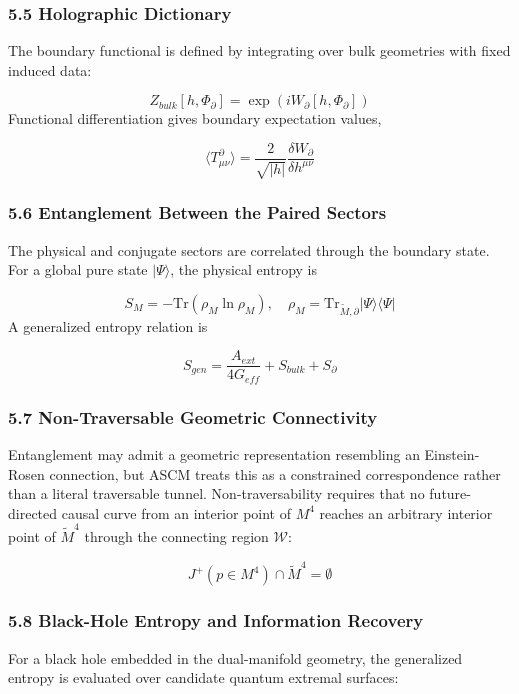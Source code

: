 \documentclass[aps,prd,onecolumn,superscriptaddress,nofootinbib,longbibliography,10pt]{revtex4-2}
\begin{document}
  
\subsubsection*{5.5 Holographic Dictionary}

  The boundary functional is defined by integrating over bulk geometries with fixed induced data:


  \[ Z_{bulk}[h, \Phi_\partial] = \exp(i W_\partial[h, \Phi_\partial]) \]
  Functional differentiation gives boundary expectation values,


  \[ \langle T^\partial_{\mu\nu} \rangle = \frac{2}{\sqrt{|h|}} \frac{\delta W_{\partial}}{\delta h^{\mu\nu}} \]

  
\subsubsection*{5.6 Entanglement Between the Paired Sectors}

  The physical and conjugate sectors are correlated through the boundary state. For a global pure state \(|\Psi\rangle\), the physical entropy is


  \[ S_M = -\text{Tr}(\rho_M \ln\rho_M), \quad \rho_M = \text{Tr}_{\tilde{M},\partial} |\Psi\rangle\langle\Psi| \]
  A generalized entropy relation is


  \[ S_{gen} = \frac{A_{ext}}{4G_{eff}} + S_{bulk} + S_\partial \]

  
\subsubsection*{5.7 Non-Traversable Geometric Connectivity}

  Entanglement may admit a geometric representation resembling an Einstein-Rosen connection, but ASCM treats this as a constrained correspondence rather than a literal traversable tunnel. Non-traversability requires that no future-directed causal curve from an interior point of \(M^4\) reaches an arbitrary interior point of \(\tilde{M}^4\) through the connecting region \(\mathcal{W}\):


  \[ J^+(p \in M^4) \cap \tilde{M}^4 = \emptyset \]

  
\subsubsection*{5.8 Black-Hole Entropy and Information Recovery}

  For a black hole embedded in the dual-manifold geometry, the generalized entropy is evaluated over candidate quantum extremal surfaces:
\end{document}
